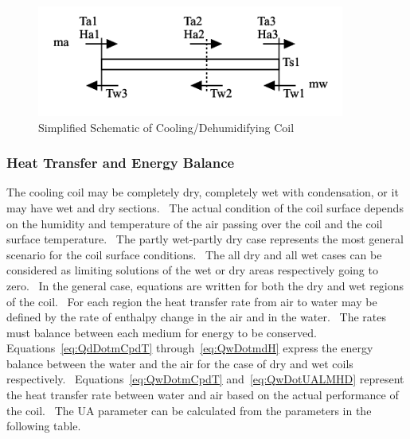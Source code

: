 \begin{figure}[hbtp] %
\centering
\includegraphics[width=0.9\textwidth, height=0.9\textheight, keepaspectratio=true]{media/image3352.svg.png}
\caption{Simplified Schematic of Cooling/Dehumidifying Coil \protect \label{fig:simplified-schematic-of-coolingdehumidifying-001}}
\end{figure}

\subsubsection{Heat Transfer and Energy Balance}\label{heat-transfer-and-energy-balance-1}

The cooling coil may be completely dry, completely wet with condensation, or it may have wet and dry sections.~ The actual condition of the coil surface depends on the humidity and temperature of the air passing over the coil and the coil surface temperature.~ The partly wet-partly dry case represents the most general scenario for the coil surface conditions.~ The all dry and all wet cases can be considered as limiting solutions of the wet or dry areas respectively going to zero.~ In the general case, equations are written for both the dry and wet regions of the coil.~ For each region the heat transfer rate from air to water may be defined by the rate of enthalpy change in the air and in the water.~ The rates must balance between each medium for energy to be conserved.~ Equations~\ref{eq:QdDotmCpdT} through~\ref{eq:QwDotmdH} express the energy balance between the water and the air for the case of dry and wet coils respectively.~ Equations~\ref{eq:QwDotmCpdT} and~\ref{eq:QwDotUALMHD} represent the heat transfer rate between water and air based on the actual performance of the coil.~ The UA parameter can be calculated from the parameters in the following table.

